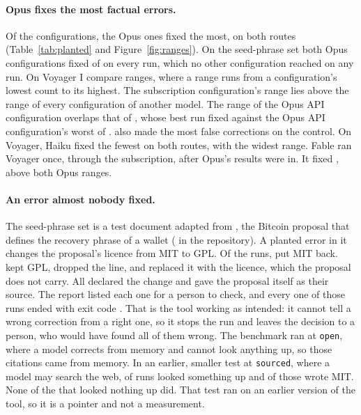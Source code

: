 \paragraph{Opus fixes the most factual errors.} Of the  configurations, the Opus ones fixed the most, on both routes (Table~\ref{tab:planted} and Figure~\ref{fig:ranges}). On the seed-phrase set both Opus configurations fixed  of  on every run, which no other configuration reached on any run. On Voyager I compare ranges, where a range runs from a configuration's lowest count to its highest. The subscription configuration's range lies above the range of every configuration of another model. The range of the Opus API configuration overlaps that of \texttt{}, whose best run fixed  against the Opus API configuration's worst of . \texttt{} also made the most false corrections on the control. On Voyager, Haiku fixed the fewest on both routes, with the widest range. Fable ran Voyager once, through the subscription, after Opus's results were in. It fixed , above both Opus ranges.

\paragraph{An error almost nobody fixed.} The seed-phrase set is a test document adapted from , the Bitcoin proposal that defines the recovery phrase of a wallet (\texttt{} in the repository). A planted error in it changes the proposal's licence from MIT to GPL. Of the  runs,  put MIT back.  kept GPL,  dropped the line, and  replaced it with the  licence, which the proposal does not carry. All  declared the change and gave the proposal itself as their source. The report listed each one for a person to check, and every one of those runs ended with exit code . That is the tool working as intended: it cannot tell a wrong correction from a right one, so it stops the run and leaves the decision to a person, who would have found all  of them wrong. The benchmark ran at \texttt{open}, where a model corrects from memory and cannot look anything up, so those citations came from memory. In an earlier, smaller test at \texttt{sourced}, where a model may search the web,  of  runs looked something up and  of those wrote MIT. None of the  that looked nothing up did. That test ran on an earlier version of the tool, so it is a pointer and not a measurement.

